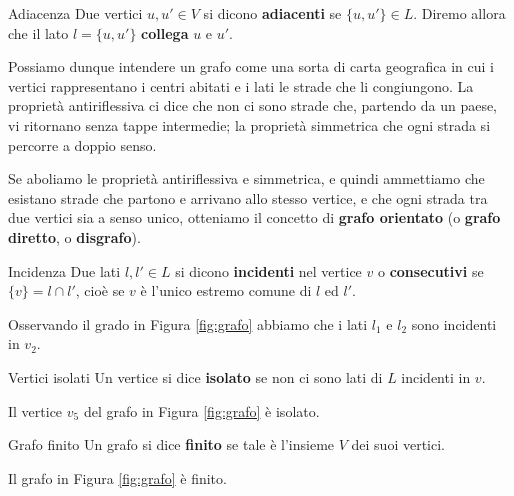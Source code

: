 \begin{defbox}{Adiacenza}
    Due vertici $u,u' \in V$ si dicono \textbf{adiacenti} se $\{u,u'\} \in L$. Diremo allora che il lato $l=\{u,u'\}$ \textbf{collega} $u$ e $u'$.
\end{defbox}

\begin{osservation}
	Possiamo dunque intendere un grafo come una sorta di carta geografica in cui i vertici rappresentano i centri abitati e i lati le strade che li congiungono. La proprietà antiriflessiva ci dice che non ci sono strade che, partendo da un paese, vi ritornano senza tappe intermedie; la proprietà simmetrica che ogni strada si percorre a doppio senso.
\end{osservation}

Se aboliamo le proprietà antiriflessiva e simmetrica, e quindi ammettiamo che esistano strade che partono e arrivano allo stesso vertice, e che ogni strada tra due vertici sia a senso unico, otteniamo il concetto di \textbf{grafo orientato} (o \textbf{grafo diretto}, o \textbf{disgrafo}).

\begin{center}
\end{center}

\begin{defbox}{Incidenza}
    Due lati $l,l' \in L$ si dicono \textbf{incidenti} nel vertice $v$ o \textbf{consecutivi} se $\{v\} = l \cap l'$, cioè se $v$ è l'unico estremo comune di $l$ ed $l'$.
\end{defbox}
\begin{example}
	Osservando il grado in Figura \ref{fig:grafo} abbiamo che i lati $l_{1}$ e $l_{2}$ sono incidenti in $v_{2}$.
\end{example}
\begin{defbox}{Vertici isolati}
    Un vertice si dice \textbf{isolato} se non ci sono lati di $L$ incidenti in $v$.
\end{defbox}
\begin{example}
	Il vertice $v_{5}$ del grafo in Figura \ref{fig:grafo} è isolato.
\end{example}
\begin{defbox}{Grafo finito}
    Un grafo si dice \textbf{finito} se tale è l'insieme $V$ dei suoi vertici.
\end{defbox}
\begin{example}
	Il grafo in Figura \ref{fig:grafo} è finito.
\end{example}


